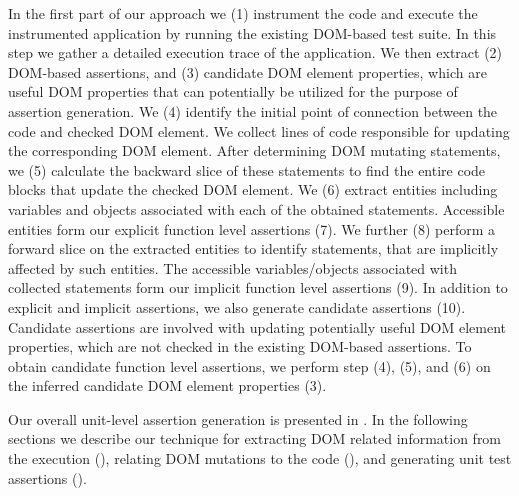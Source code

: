 In the first part of our approach we (1) instrument the \javascript code and execute the instrumented application by running the existing DOM-based test suite. In this step we gather a detailed execution trace of the application. We then extract (2) DOM-based assertions, and (3) candidate DOM element properties, which are useful DOM properties that can potentially be utilized for the purpose of assertion generation. We (4) identify the initial point of connection between the \javascript code and checked DOM element. We collect lines of code responsible for updating the corresponding DOM element. After determining DOM mutating statements, we (5) calculate the backward slice of these statements to find the entire code blocks that update the checked DOM element. We (6) extract \javascript entities including variables and objects associated with each of the obtained statements. Accessible entities form our explicit function level assertions (7). We further (8) perform a forward slice on the extracted \javascript entities to identify statements, that are implicitly affected by such entities. The accessible \javascript variables/objects associated with collected statements form our implicit function level assertions (9). In addition to explicit and implicit assertions, we also generate candidate assertions (10). Candidate assertions are involved with updating potentially useful DOM element properties, which are not checked in the existing DOM-based assertions. To obtain candidate function level assertions, we perform step (4), (5), and (6) on the inferred candidate DOM element properties (3).

Our overall unit-level assertion generation is presented in . In the following sections we describe our technique for extracting DOM related information from the execution (), relating
DOM mutations to the \javascript code (), and generating unit test assertions ().   


         
